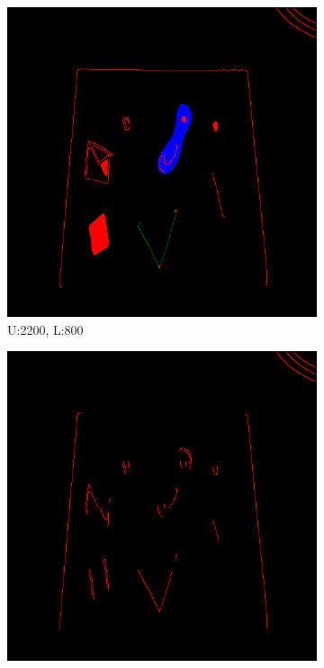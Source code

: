 \documentclass[11pt]{article}
\begin{document}
\begin{figure}[H]
	\begin{subfigure}[t]{.25\textwidth}
		\centering
		\includegraphics[scale=0.3]{pics/normalThreshTest/Upper2200lower800kernel5.png}
		\caption{U:2200, L:800}
	\end{subfigure}
\hfill
	\begin{subfigure}[t]{.25\textwidth}
		\centering
		\includegraphics[scale=0.3]{pics/normalThreshTest/Upper2200lower1400kernel5.png}

\end{subfigure}
\end{figure}
\end{document}
